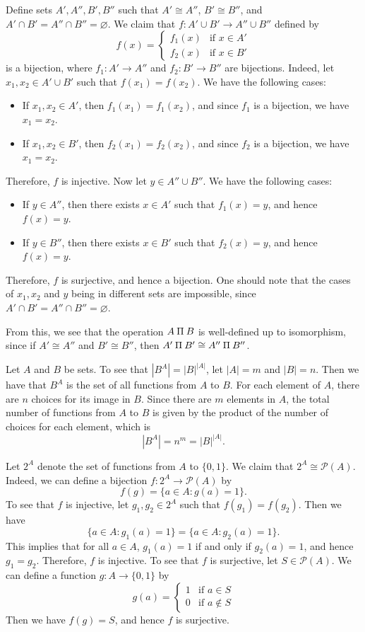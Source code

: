 \exercise Define sets $A', A'', B', B''$ such that $A' \cong A''$, $B' \cong B''$, and $A' \cap B' = A'' \cap B'' = \varnothing$. We claim that $f : A' \cup B' \to A'' \cup B''$ defined by
\[f(x) = \begin{cases}
    f_1(x) & \text{if } x \in A' \\
    f_2(x) & \text{if } x \in B'
\end{cases}\]
is a bijection, where $f_1 : A' \to A''$ and $f_2 : B' \to B''$ are bijections. Indeed, let $x_1, x_2 \in A' \cup B'$ such that $f(x_1) = f(x_2)$. We have the following cases:
\begin{itemize}
    \item If $x_1, x_2 \in A'$, then $f_1(x_1) = f_1(x_2)$, and since $f_1$ is a bijection, we have $x_1 = x_2$.
    \item If $x_1, x_2 \in B'$, then $f_2(x_1) = f_2(x_2)$, and since $f_2$ is a bijection, we have $x_1 = x_2$.
\end{itemize}
Therefore, $f$ is injective. Now let $y \in A'' \cup B''$. We have the following cases:
\begin{itemize}
    \item If $y \in A''$, then there exists $x \in A'$ such that $f_1(x) = y$, and hence $f(x) = y$.
    \item If $y \in B''$, then there exists $x \in B'$ such that $f_2(x) = y$, and hence $f(x) = y$.
\end{itemize}
Therefore, $f$ is surjective, and hence a bijection. One should note that the cases of $x_1, x_2$ and $y$ being in different sets are impossible, since $A' \cap B' = A'' \cap B'' = \varnothing$.

From this, we see that the operation $A \invamalg B$ is well-defined up to isomorphism, since if $A' \cong A''$ and $B' \cong B''$, then $A' \invamalg B' \cong A'' \invamalg B''$.

\exercise Let $A$ and $B$ be sets. To see that $|B^A| = |B|^{|A|}$, let $|A| = m$ and $|B| = n$. Then we have that $B^A$ is the set of all functions from $A$ to $B$. For each element of $A$, there are $n$ choices for its image in $B$. Since there are $m$ elements in $A$, the total number of functions from $A$ to $B$ is given by the product of the number of choices for each element, which is
\[|B^A| = n^m = |B|^{|A|}.\]

\exercise Let $2^A$ denote the set of functions from $A$ to $\{0,1\}$. We claim that $2^A \cong \mathscr{P}(A)$. Indeed, we can define a bijection $f : 2^A \to \mathscr{P}(A)$ by
\[f(g) = \{a \in A : g(a) = 1\}.\]
To see that $f$ is injective, let $g_1, g_2 \in 2^A$ such that $f(g_1) = f(g_2)$. Then we have
\[\{a \in A : g_1(a) = 1\} = \{a \in A : g_2(a) = 1\}.\]
This implies that for all $a \in A$, $g_1(a) = 1$ if and only if $g_2(a) = 1$, and hence $g_1 = g_2$. Therefore, $f$ is injective. To see that $f$ is surjective, let $S \in \mathscr{P}(A)$. We can define a function $g : A \to \{0,1\}$ by
\[g(a) = \begin{cases}
    1 & \text{if } a \in S \\
    0 & \text{if } a \not\in S
\end{cases}\]
Then we have $f(g) = S$, and hence $f$ is surjective.